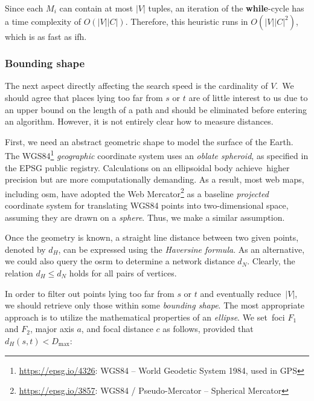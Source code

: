 Since each $M_{i}$ can contain at most $\lvert V \rvert$ tuples, an iteration of the \textbf{while}-cycle has a time complexity of $O(\lvert V \rvert \lvert C \rvert)$. Therefore, this heuristic runs in $O(\lvert V \rvert \lvert C \rvert^{2})$, which is as fast as \acs{ifh}.


\subsubsection*{Bounding shape}


The next aspect directly affecting the search speed is the cardinality of $V$.~We should agree that places lying too far from $s$ or $t$ are of little interest to us due to an upper bound on the length of a path and should be eliminated before entering an algorithm. However, it is not entirely clear how to measure distances.

First, we need an abstract geometric shape to model the surface of the Earth. The WGS84\footnote{\href{https://epsg.io/4326}{https://epsg.io/4326}: WGS84 -- World Geodetic System 1984, used in GPS} \emph{geographic} coordinate system uses an \emph{oblate spheroid}, as specified in the EPSG public registry. Calculations on an ellipsoidal body achieve~higher precision but are more computationally demanding. As a result, most web maps, in\-clud\-ing \acs{osm}, have adopted the Web Mercator\footnote{\href{https://epsg.io/3857}{https://epsg.io/3857}: WGS84 / Pseudo-Mercator -- Spherical Mercator} as a baseline \emph{projected} coordinate system for translating WGS84 points into two-dimensional space, assuming they are drawn on a \emph{sphere}. Thus, we make a similar assumption.

Once the geometry is known, a straight line distance between two given points, denoted by $d_{H}$, can be expressed using the \emph{Haversine formula}. As an alternative, we could also query the \acs{osrm} to determine a network distance $d_{N}$. Clearly, the relation $d_{H} \leq d_{N}$ holds for all pairs of vertices.

In order to filter out points lying too far from $s$ or $t$ and eventually reduce~$\lvert V \rvert$, we should retrieve only those within some \emph{bounding shape}. The most appropriate approach is to utilize the mathematical properties of an \emph{ellipse}. We set~foci $F_{1}$ and $F_{2}$, major axis $a$, and focal distance $c$ as follows, provided that $d_{H}(s, t) < D_{\text{max}}$:


